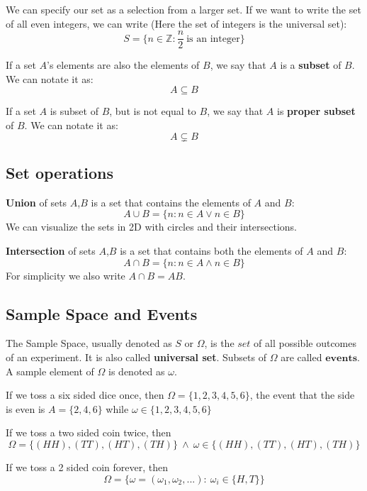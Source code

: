 We can specify our set  as a selection from a larger set. If we want to write the set of all even integers, we can write (Here the set of integers is the universal set):
 \[ S = \{n \in \mathbb{Z}: \frac{n}{2} \ \text{is an integer} \} \]
\par 
If a set $A$'s elements are also the elements of $B$, we say that $A$ is a \textbf{subset} of $B$. We can notate it as:
\[ A \subseteq B \]
\par
If a set $A$ is subset of $B$, but is not equal to $B$, we say that $A$ is \textbf{proper subset} of $B$. We can notate it as:
\[A \subsetneq B\]

\subsection*{Set operations}
\textbf{Union} of sets $A$,$B$ is a set that contains the elements of $A$ and $B$:
\[A \cup B = \{n:n \in A  \lor  n  \in B\}\]
We can visualize the sets in 2D with circles and their intersections.  











\textbf{Intersection} of sets $A$,$B$ is a set that contains both the elements of $A$ and $B$:
$$A \cap B = \{n:n \in A  \land  n  \in B\}$$
For simplicity we also write $A \cap B = AB$.


\par






\subsection*{Sample Space and Events}
The Sample Space, usually denoted as $S$ or $\Omega$, is the $\textit{set}$ of all possible outcomes of an experiment. It is also called  \textbf{universal set}. Subsets of $\Omega$ are called $\textbf{events}$. A sample element of $\Omega$ is denoted as $\omega$.

\begin{example}
    If we toss a six sided dice once, then $\Omega = \{1,2,3,4,5,6\}$, the event that the side is even is $A= \{2,4,6\}$ while $\omega \in \{1,2,3,4,5,6\}$
\end{example}

\begin{example}
    If we toss a two sided coin twice, then $$\Omega = \{(HH),(TT),(HT),(TH)\} \ \land \ \omega \in \{(HH),(TT),(HT),(TH)\}$$
\end{example}
\begin{example}
    If we toss a 2 sided coin forever, then $$\Omega = \{\omega= (\omega_1,\omega_2,...): \ \omega_i \in \{H,T\} \}$$
\end{example}

